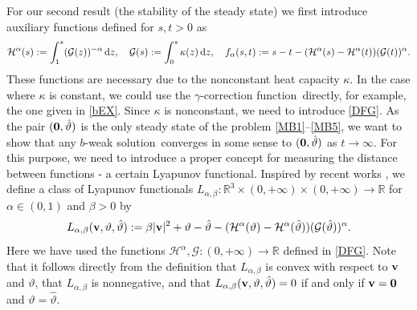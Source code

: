 \documentclass[11pt, a4paper, reqno]{amsart}
\newcommand{\R}{{\mathbb R}}
\numberwithin{equation}{section}
\newcommand{\thetah}{\hat\thet}
\newcommand{\vc}[1]{{\bf #1}}
\newcommand{\vv}{\vc{v}}
\newcommand{\thet}{\vartheta}
\newcommand{\G}{\mathcal{G}}
\newcommand{\al}{\alpha}
\newcommand{\ff}{f}
\newcommand{\bb}{b}
\newcommand{\blafnc}{correction function}
\newcommand{\bws}{$\bb$-weak solution}
\newcommand{\Lab}{L_{\alpha,\beta}}
\begin{document}
For our second result (the stability of the steady state) we first introduce auxiliary functions defined for $s,t>0$ as
\begin{equation}\label{DFG}
\mathcal{H}^\al(s):= \int_1^s (\G(z))^{-\al}\,{\rm d}z,\quad \G(s):=\int_0^s \kappa(z)\, {\rm d} z,\quad \ff_\alpha(s,t):=s-t - (\mathcal{H}^\al(s) - \mathcal{H}^\al(t))(\G(t))^{\al}.
\end{equation}
These functions are necessary due to the nonconstant heat capacity $\kappa$. In the case where $\kappa$ is constant, we could use the $\gamma$-\blafnc \ directly, for example, the one given in \eqref{bEX}. Since $\kappa$ is nonconstant, we need to introduce \eqref{DFG}. As the pair $(\vc{0},\thetah)$ is the only steady state of the problem \eqref{MB1}--\eqref{MB5}, we want to show that any \bws\ converges in some sense to $(\vc{0},\thetah)$ as $t\to \infty$. For this purpose, we need to introduce a proper concept for measuring the distance between functions - a certain Lyapunov functional. Inspired by recent works \cite{AbBuKa2024, DosPruRaj}, we define a class of Lyapunov functionals $\Lab:\mathbb{R}^3\times(0,+\infty)\times(0,+\infty)\to\mathbb{R}$ for $\alpha\in(0,1)$ and $\beta>0$ by
\begin{equation}\label{LMB}
\Lab(\vv,\thet,\thetah):= \beta|\vv|^2 + \thet-\thetah - (\mathcal{H}^\al(\thet) - \mathcal{H}^\al(\thetah))(\G(\thetah))^{\al}.
\end{equation}
Here we have used the functions $\mathcal{H}^\al, \G:(0,+\infty)\to\R$ defined in \eqref{DFG}. Note that it follows directly from the definition that $\Lab$ is convex with respect to $\vv$ and $\thet$, that $\Lab$ is nonnegative, and that $\Lab(\vv, \thet, \thetah)=0$ if and only if $\vv =\vc{0}$ and $\thet=\thetah$.

\bigskip
\end{document}
